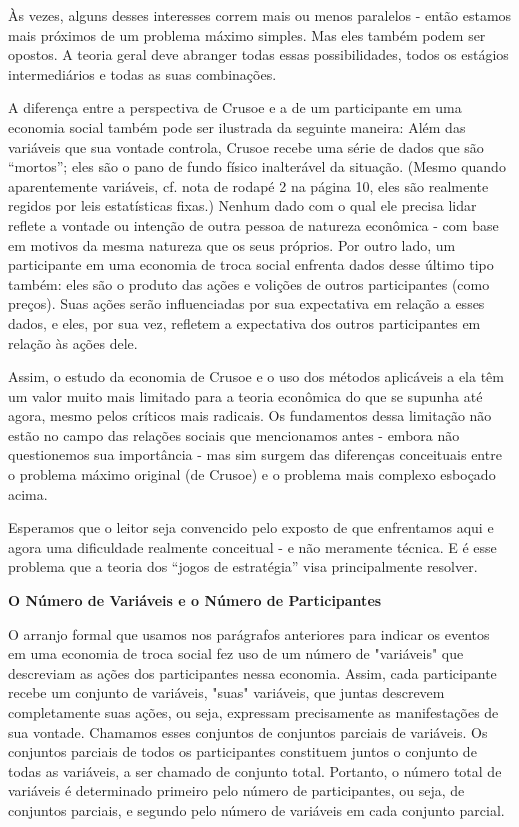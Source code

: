 \documentclass[12pt]{article}
\begin{document}
Às vezes, alguns desses interesses correm mais ou menos paralelos - então estamos mais próximos de um problema máximo simples. Mas eles também podem ser opostos. A teoria geral deve abranger todas essas possibilidades, todos os estágios intermediários e todas as suas combinações.

A diferença entre a perspectiva de Crusoe e a de um participante em uma economia social também pode ser ilustrada da seguinte maneira: Além das variáveis que sua vontade controla, Crusoe recebe uma série de dados que são “mortos”; eles são o pano de fundo físico inalterável da situação. (Mesmo quando aparentemente variáveis, cf. nota de rodapé 2 na página 10, eles são realmente regidos por leis estatísticas fixas.) Nenhum dado com o qual ele precisa lidar reflete a vontade ou intenção de outra pessoa de natureza econômica - com base em motivos da mesma natureza que os seus próprios. Por outro lado, um participante em uma economia de troca social enfrenta dados desse último tipo também: eles são o produto das ações e volições de outros participantes (como preços). Suas ações serão influenciadas por sua expectativa em relação a esses dados, e eles, por sua vez, refletem a expectativa dos outros participantes em relação às ações dele.

Assim, o estudo da economia de Crusoe e o uso dos métodos aplicáveis a ela têm um valor muito mais limitado para a teoria econômica do que se supunha até agora, mesmo pelos críticos mais radicais. Os fundamentos dessa limitação não estão no campo das relações sociais que mencionamos antes - embora não questionemos sua importância - mas sim surgem das diferenças conceituais entre o problema máximo original (de Crusoe) e o problema mais complexo esboçado acima.

Esperamos que o leitor seja convencido pelo exposto de que enfrentamos aqui e agora uma dificuldade realmente conceitual - e não meramente técnica. E é esse problema que a teoria dos “jogos de estratégia” visa principalmente resolver.

\textbf{O Número de Variáveis e o Número de Participantes}

O arranjo formal que usamos nos parágrafos anteriores para indicar os eventos em uma economia de troca social fez uso de um número de "variáveis" que descreviam as ações dos participantes nessa economia. Assim, cada participante recebe um conjunto de variáveis, "suas" variáveis, que juntas descrevem completamente suas ações, ou seja, expressam precisamente as manifestações de sua vontade. Chamamos esses conjuntos de conjuntos parciais de variáveis. Os conjuntos parciais de todos os participantes constituem juntos o conjunto de todas as variáveis, a ser chamado de conjunto total. Portanto, o número total de variáveis é determinado primeiro pelo número de participantes, ou seja, de conjuntos parciais, e segundo pelo número de variáveis em cada conjunto parcial.
\end{document}
